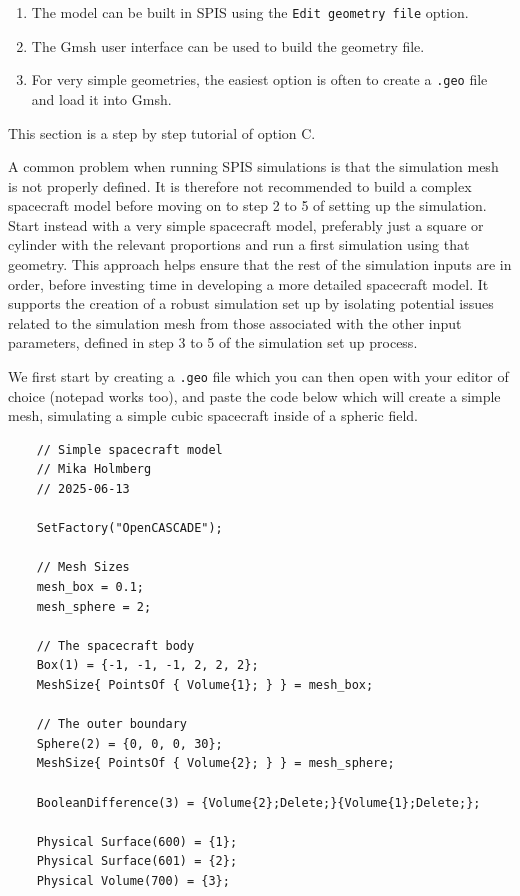 \documentclass[a4paper, 11pt]{article}
\begin{document}
\begin{enumerate}[label=\Alph*.]
    \item The model can be built in SPIS using the \verb|Edit geometry file| option.
    \item The Gmsh user interface can be used to build the geometry file.
    \item For very simple geometries, the easiest option is often to create a \verb|.geo| file and load it into Gmsh.
\end{enumerate}

This section is a step by step tutorial of option C.\par
A common problem when running SPIS simulations is that the simulation mesh is not properly defined. It is therefore not recommended to build a complex spacecraft model before moving on to step 2 to 5 of setting up the simulation. Start instead with a very simple spacecraft model, preferably just a square or cylinder with the relevant proportions and run a first simulation using that geometry. This approach helps ensure that the rest of the simulation inputs are in order, before investing time in developing a more detailed spacecraft model. It supports the creation of a robust  simulation set up by isolating potential issues related to the simulation mesh from those associated with the other input parameters, defined in step 3 to 5 of the simulation set up process.\par
We first start by creating a \verb|.geo| file which you can then open with your editor of choice (notepad works too), and paste the code below which will create a simple mesh, simulating a simple cubic spacecraft inside of a spheric field.

\begin{verbatim}
    // Simple spacecraft model 
    // Mika Holmberg 
    // 2025-06-13

    SetFactory("OpenCASCADE");

    // Mesh Sizes
    mesh_box = 0.1;
    mesh_sphere = 2;

    // The spacecraft body 
    Box(1) = {-1, -1, -1, 2, 2, 2};
    MeshSize{ PointsOf { Volume{1}; } } = mesh_box;

    // The outer boundary
    Sphere(2) = {0, 0, 0, 30};
    MeshSize{ PointsOf { Volume{2}; } } = mesh_sphere;

    BooleanDifference(3) = {Volume{2};Delete;}{Volume{1};Delete;};

    Physical Surface(600) = {1};
    Physical Surface(601) = {2};
    Physical Volume(700) = {3};
\end{verbatim}
\end{document}
